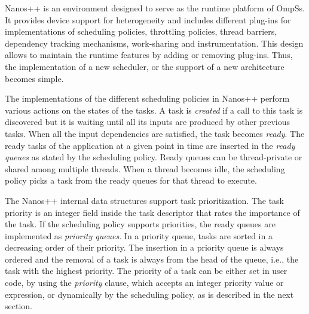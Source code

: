 {Nanos++ is an environment designed to serve as the runtime platform of OmpSs. 
It provides device support for heterogeneity and includes different plug-ins for implementations of scheduling policies, throttling policies, thread barriers, dependency tracking mechanisms, work-sharing and instrumentation. 
This design allows to maintain the runtime features by adding or removing plug-ins. 
Thus, the implementation of a new scheduler, or the support of a new architecture becomes simple.

The implementations of the different scheduling policies in Nanos++ perform various actions on the states of the tasks. 
A task is \textit{created} if a call to this task is discovered but it is waiting until all its inputs are produced by other previous tasks. 
When all the input dependencies are satisfied, the task becomes \textit{ready}. 
The ready tasks of the application at a given point in time are inserted in the \textit{ready queues} as stated by the scheduling policy. 
Ready queues can be thread-private or shared among multiple threads. 
When a thread becomes idle, the scheduling policy picks a task from the ready queues for that thread to execute. 

The Nanos++ internal data structures support task prioritization. 
The task priority is an integer field inside the task descriptor that rates the importance of the task. 
If the scheduling policy supports priorities, the ready queues are implemented as \textit{priority queues}. 
In a priority queue, tasks are sorted in a decreasing order of their priority. 
The insertion in a priority queue is always ordered and the removal of a task is always from the head of the queue, i.e., the task with the highest priority. 
The priority of a task can be either set in user code, by using the \textit{priority} clause, which accepts an integer priority value or expression, or dynamically  by the scheduling policy, as is described in the next section.




}
